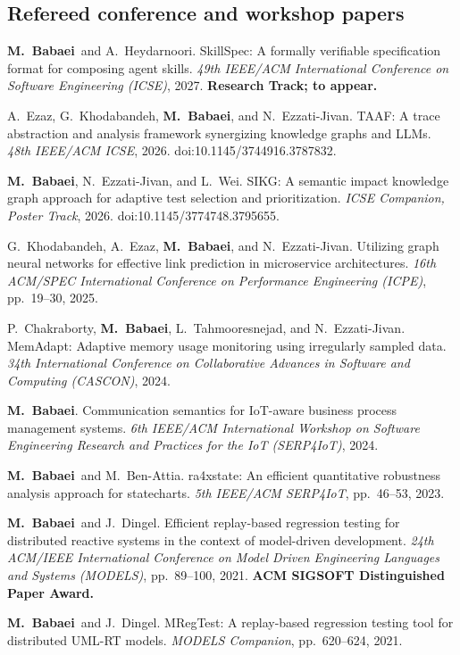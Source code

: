 \documentclass[10pt,letterpaper]{article}
\newcommand{\me}{\textbf{M.~Babaei}}
\begin{document}
\subsection{Refereed conference and workshop papers}
\begin{enumerate}[label={[C\arabic*]}]
\item \me\ and A.\ Heydarnoori. SkillSpec: A formally verifiable specification format for composing agent skills. \emph{49th IEEE/ACM International Conference on Software Engineering (ICSE)}, 2027. \textbf{Research Track; to appear.}
\item A.\ Ezaz, G.\ Khodabandeh, \me, and N.\ Ezzati-Jivan. TAAF: A trace abstraction and analysis framework synergizing knowledge graphs and LLMs. \emph{48th IEEE/ACM ICSE}, 2026. doi:10.1145/3744916.3787832.
\item \me, N.\ Ezzati-Jivan, and L.\ Wei. SIKG: A semantic impact knowledge graph approach for adaptive test selection and prioritization. \emph{ICSE Companion, Poster Track}, 2026. doi:10.1145/3774748.3795655.
\item G.\ Khodabandeh, A.\ Ezaz, \me, and N.\ Ezzati-Jivan. Utilizing graph neural networks for effective link prediction in microservice architectures. \emph{16th ACM/SPEC International Conference on Performance Engineering (ICPE)}, pp.\ 19--30, 2025.
\item P.\ Chakraborty, \me, L.\ Tahmooresnejad, and N.\ Ezzati-Jivan. MemAdapt: Adaptive memory usage monitoring using irregularly sampled data. \emph{34th International Conference on Collaborative Advances in Software and Computing (CASCON)}, 2024.
\item \me. Communication semantics for IoT-aware business process management systems. \emph{6th IEEE/ACM International Workshop on Software Engineering Research and Practices for the IoT (SERP4IoT)}, 2024.
\item \me\ and M.\ Ben-Attia. ra4xstate: An efficient quantitative robustness analysis approach for statecharts. \emph{5th IEEE/ACM SERP4IoT}, pp.\ 46--53, 2023.
\item \me\ and J.\ Dingel. Efficient replay-based regression testing for distributed reactive systems in the context of model-driven development. \emph{24th ACM/IEEE International Conference on Model Driven Engineering Languages and Systems (MODELS)}, pp.\ 89--100, 2021. \textbf{ACM SIGSOFT Distinguished Paper Award.}
\item \me\ and J.\ Dingel. MRegTest: A replay-based regression testing tool for distributed UML-RT models. \emph{MODELS Companion}, pp.\ 620--624, 2021.

\end{enumerate}
\end{document}
